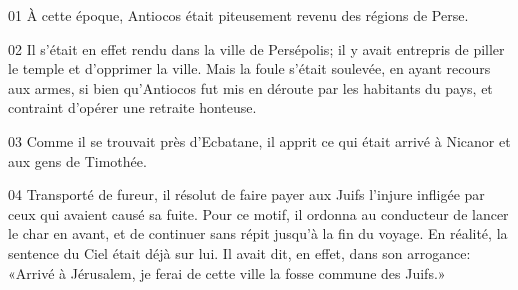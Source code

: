 01 À cette époque, Antiocos était piteusement revenu des régions de Perse.

02 Il s’était en effet rendu dans la ville de Persépolis; il y avait entrepris de piller le temple et d’opprimer la ville. Mais la foule s’était soulevée, en ayant recours aux armes, si bien qu’Antiocos fut mis en déroute par les habitants du pays, et contraint d’opérer une retraite honteuse.

03 Comme il se trouvait près d’Ecbatane, il apprit ce qui était arrivé à Nicanor et aux gens de Timothée.

04 Transporté de fureur, il résolut de faire payer aux Juifs l’injure infligée par ceux qui avaient causé sa fuite. Pour ce motif, il ordonna au conducteur de lancer le char en avant, et de continuer sans répit jusqu’à la fin du voyage. En réalité, la sentence du Ciel était déjà sur lui. Il avait dit, en effet, dans son arrogance: «Arrivé à Jérusalem, je ferai de cette ville la fosse commune des Juifs.»
